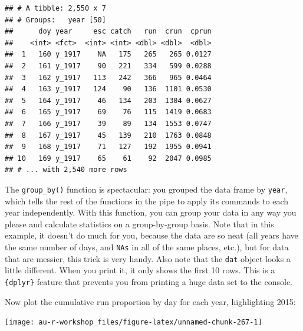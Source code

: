 \documentclass[]{book}
\begin{document}
\begin{verbatim}
## # A tibble: 2,550 x 7
## # Groups:   year [50]
##      doy year     esc catch   run  crun  cprun
##    <int> <fct>  <int> <int> <dbl> <dbl>  <dbl>
##  1   160 y_1917    NA   175   265   265 0.0127
##  2   161 y_1917    90   221   334   599 0.0288
##  3   162 y_1917   113   242   366   965 0.0464
##  4   163 y_1917   124    90   136  1101 0.0530
##  5   164 y_1917    46   134   203  1304 0.0627
##  6   165 y_1917    69    76   115  1419 0.0683
##  7   166 y_1917    39    89   134  1553 0.0747
##  8   167 y_1917    45   139   210  1763 0.0848
##  9   168 y_1917    71   127   192  1955 0.0941
## 10   169 y_1917    65    61    92  2047 0.0985
## # ... with 2,540 more rows
\end{verbatim}

The \texttt{group\_by()} function is spectacular: you grouped the data frame by \texttt{year}, which tells the rest of the functions in the pipe to apply its commands to each year independently. With this function, you can group your data in any way you please and calculate statistics on a group-by-group basis. Note that in this example, it doesn't do much for you, because the data are so neat (all years have the same number of days, and \texttt{NAs} in all of the same places, etc.), but for data that are messier, this trick is very handy. Also note that the \texttt{dat} object looks a little different. When you print it, it only shows the first 10 rows. This is a \texttt{\{dplyr\}} feature that prevents you from printing a huge data set to the console.

Now plot the cumulative run proportion by day for each year, highlighting 2015:

\begin{center}\texttt{[image: au-r-workshop\_files/figure-latex/unnamed-chunk-267-1]} \end{center}
\end{document}
